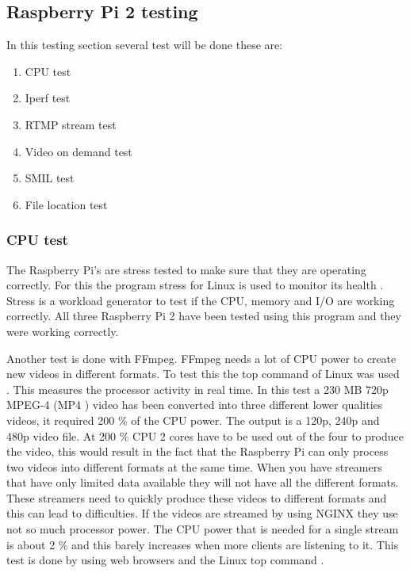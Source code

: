 \documentclass{sig-alternate-br}
\begin{document}
\subsection{Raspberry Pi 2  testing}

In this testing section several test will be done these are: 
\begin{enumerate}[topsep=0pt,itemsep=-1ex,partopsep=1ex,parsep=1ex] 
	\item CPU test
	\item Iperf test
	\item RTMP stream test
	\item Video on demand test
	\item SMIL test
	\item File location test
\end{enumerate}

\subsubsection{CPU test}

The Raspberry Pi's are stress tested to make sure that they are operating correctly. For this the program stress for Linux is used to monitor its health \cite{stress}. Stress is a workload generator to test if the CPU, memory and I/O are working correctly. All three Raspberry Pi 2 have been tested using this program and they were working correctly. 

Another test is done with FFmpeg. FFmpeg needs a lot of CPU power to create new videos in different formats. To test this the top command of Linux was used \cite{top}. This measures the processor activity in real time. In this test a 230 MB 720p MPEG-4 (MP4 ) video has been converted into three different lower qualities videos, it required 200 \% of the CPU power. The output is a 120p, 240p and 480p video file. At 200 \% CPU 2 cores have to be used out of the four to produce the video, this would result in the fact that the Raspberry Pi can only process two videos into different formats at the same time. When you have streamers that have only limited data available they will not have all the different formats. These streamers need to quickly produce these videos to different formats and this can lead to difficulties.  \newline
If the videos are streamed by using NGINX they use not so much processor power. The CPU power that is needed for a single stream is about 2 \% and this barely increases when more clients are listening to it. This test is done by using web browsers and the Linux top command \cite{top}. 
\end{document}
